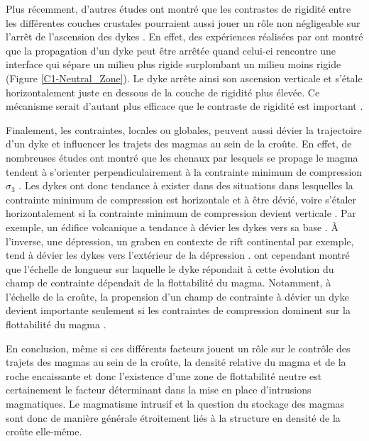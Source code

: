 Plus  récemment, d'autres  études  ont montré  que  les contrastes  de
rigidité  entre les  différentes  couches  crustales pourraient  aussi
jouer un  rôle non  négligeable sur l'arrêt  de l'ascension  des dykes
\citep{Menand:2011ki}.   En  effet,   des  expériences  réalisées  par
\citet{Kavanagh:2006ig} ont  montré que la propagation  d'un dyke peut
être  arrêtée quand  celui-ci rencontre  une interface  qui sépare  un
milieu  plus  rigide  surplombant   un  milieu  moins  rigide  (Figure
\ref{C1-Neutral_Zone}). Le  dyke arrête ainsi son  ascension verticale
et s'étale horizontalement  juste en dessous de la  couche de rigidité
plus  élevée.   Ce mécanisme  serait  d'autant  plus efficace  que  le
contraste de rigidité est important \citep{Kavanagh:2006ig}.

Finalement, les contraintes, locales ou globales, peuvent aussi dévier
la trajectoire d'un dyke et influencer  les trajets des magmas au sein
de  la croûte.   En effet,  de nombreuses  études ont  montré que  les
chenaux  par  lesquels  se  propage  le  magma  tendent  à  s'orienter
perpendiculairement à la contrainte  minimum de compression $\sigma_3$
\citep{Anderson:L5JA3dNN,Watanabe:2002iw}. Les dykes ont donc tendance
à exister dans des situations dans lesquelles la contrainte minimum de
compression  est   horizontale  et   à  être  dévié,   voire  s'étaler
horizontalement  si  la  contrainte  minimum  de  compression  devient
verticale   \citep{Pinel:2000wa,Pinel:2004ji,Maccaferri:2014ft}.   Par
exemple, un édifice  volcanique a tendance à dévier les  dykes vers sa
base     \citep{Watanabe:2002iw,Dahm:2000jb,Maccaferri:2011bd}.      À
l'inverse, une dépression,  un graben en contexte  de rift continental
par exemple, tend à dévier les dykes vers l'extérieur de la dépression
\citep{Maccaferri:2014ft}. \citet{Menand:2010uq}  ont cependant montré
que  l'échelle de  longueur sur  laquelle  le dyke  répondait à  cette
évolution  du champ  de  contrainte dépendait  de  la flottabilité  du
magma.  Notamment, à l'échelle de  la croûte, la propension d'un champ
de contrainte  à dévier  un dyke devient  importante seulement  si les
contraintes  de  compression dominent  sur  la  flottabilité du  magma
\citep{Menand:2010uq}.

En conclusion, même  si ces différents facteurs jouent un  rôle sur le
contrôle  des trajets  des magmas  au sein  de la  croûte, la  densité
relative du magma et de la roche encaissante et donc l'existence d'une
zone de  flottabilité neutre  est certainement le  facteur déterminant
dans  la  mise  en  place  d'intrusions  magmatiques.   Le  magmatisme
intrusif et  la question du stockage  des magmas sont donc  de manière
générale  étroitement liés  à la  structure  en densité  de la  croûte
elle-même.


